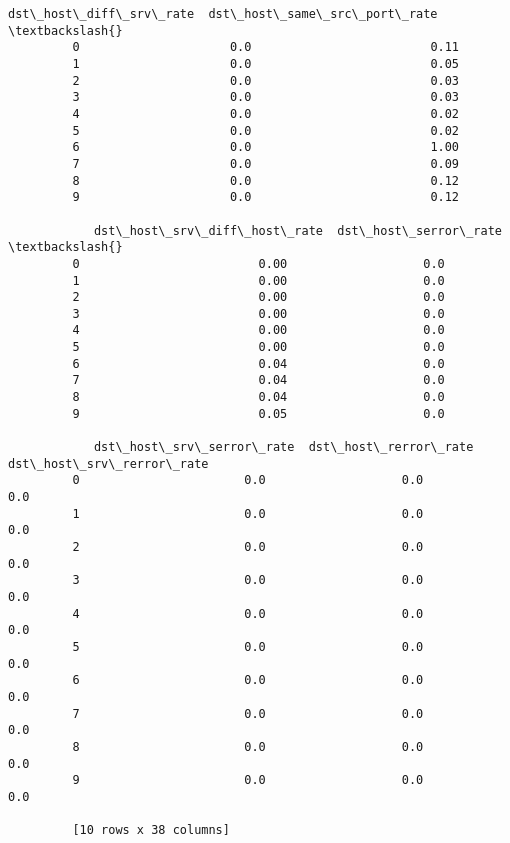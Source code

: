 \documentclass[11pt]{article}
\begin{document}
\begin{Verbatim}[commandchars=\\\{\}]
            dst\_host\_diff\_srv\_rate  dst\_host\_same\_src\_port\_rate  \textbackslash{}
         0                     0.0                         0.11   
         1                     0.0                         0.05   
         2                     0.0                         0.03   
         3                     0.0                         0.03   
         4                     0.0                         0.02   
         5                     0.0                         0.02   
         6                     0.0                         1.00   
         7                     0.0                         0.09   
         8                     0.0                         0.12   
         9                     0.0                         0.12   
         
            dst\_host\_srv\_diff\_host\_rate  dst\_host\_serror\_rate  \textbackslash{}
         0                         0.00                   0.0   
         1                         0.00                   0.0   
         2                         0.00                   0.0   
         3                         0.00                   0.0   
         4                         0.00                   0.0   
         5                         0.00                   0.0   
         6                         0.04                   0.0   
         7                         0.04                   0.0   
         8                         0.04                   0.0   
         9                         0.05                   0.0   
         
            dst\_host\_srv\_serror\_rate  dst\_host\_rerror\_rate  dst\_host\_srv\_rerror\_rate  
         0                       0.0                   0.0                       0.0  
         1                       0.0                   0.0                       0.0  
         2                       0.0                   0.0                       0.0  
         3                       0.0                   0.0                       0.0  
         4                       0.0                   0.0                       0.0  
         5                       0.0                   0.0                       0.0  
         6                       0.0                   0.0                       0.0  
         7                       0.0                   0.0                       0.0  
         8                       0.0                   0.0                       0.0  
         9                       0.0                   0.0                       0.0  
         
         [10 rows x 38 columns]
\end{Verbatim}
            
\end{document}
